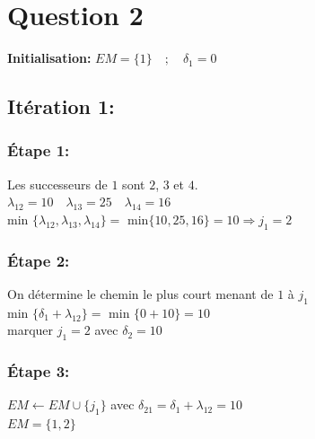 \documentclass{article}
\begin{document}
\section*{Question 2}

\textbf{Initialisation:} \quad $EM=\{1\} \quad ; \quad  \delta_1=0$
\subsection*{Itération 1:}
\subsubsection*{Étape 1:}
Les successeurs de $1$ sont $2$, $3$ et $4$.\\
$\lambda_{12}=10 \quad \lambda_{13}=25 \quad \lambda_{14}=16$\\
min $\{\lambda_{12},\lambda_{13},\lambda_{14}\} = $ min$\{10,25,16\}=10 \Rightarrow j_1 =2 $\\
\subsubsection*{Étape 2:}
On détermine le chemin le plus court menant de $1$ à $j_1$\\
min $\{ \delta_1 + \lambda_{12}\} = $ min $\{0+10\}=10 $\\
marquer $j_1=2$ avec $\delta_2=10$\\ 
\subsubsection*{Étape 3:}
$EM \leftarrow EM \cup \{j_1\}$ \quad avec $ \delta_{21} = \delta_1 + \lambda_{12} = 10$ \\
$EM = \{1,2\}$\\
\end{document}
